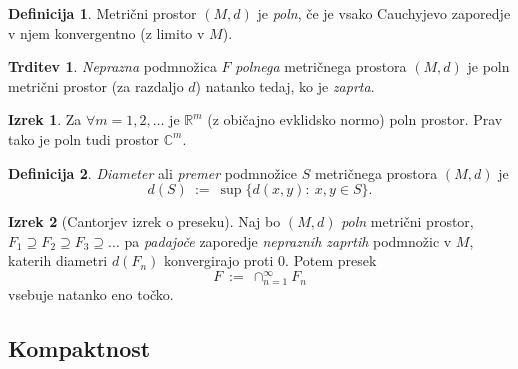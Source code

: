 \documentclass[11pt]{article}
\theoremstyle{definition}
\newtheorem{definicija}{Definicija}[section]
\theoremstyle{definition}
\newtheorem{trditev}{Trditev}[section]
\theoremstyle{definition}
\newtheorem{izrek}{Izrek}[section]
\begin{document}
\begin{definicija}

Metrični prostor $(M, d)$ je \textit{poln}, če je vsako Cauchyjevo zaporedje v njem konvergentno (z limito v $M$).

\end{definicija}
\vspace{0.5cm}

\begin{trditev}

\textit{Neprazna} podmnožica $F$ \textit{polnega} metričnega prostora $(M, d)$ je poln metrični prostor (za razdaljo $d$) natanko tedaj, ko je \textit{zaprta}.

\end{trditev}
\vspace{0.5cm}

\begin{izrek}

Za $\forall m  = 1, 2, \ldots$ je $\mathbb{R}^m$ (z običajno evklidsko normo) poln prostor. Prav tako je poln tudi prostor $\mathbb{C}^m$.

\end{izrek}
\vspace{0.5cm}

\begin{definicija}

\textit{Diameter} ali \textit{premer} podmnožice $S$ metričnega prostora $(M, d)$ je 
$$d(S) ~:=~ \sup{\{d(x,y): ~x, y \in S\}}.$$

\end{definicija}
\vspace{0.5cm}

\begin{izrek}[Cantorjev izrek o preseku]

Naj bo $(M, d)$ \textit{poln} metrični prostor, $F_1 \supseteq F_2 \supseteq F_3 \supseteq \ldots$ pa \textit{padajoče} zaporedje \textit{nepraznih zaprtih} podmnožic v $M$, katerih diametri $d(F_n)$ konvergirajo proti $0$. Potem presek 
$$F ~:=~ \cap_{n=1}^{\infty} F_n$$
vsebuje natanko eno točko.

\end{izrek}
\vspace{0.5cm}


\subsection{Kompaktnost}
\vspace{0.5cm}
\end{document}
